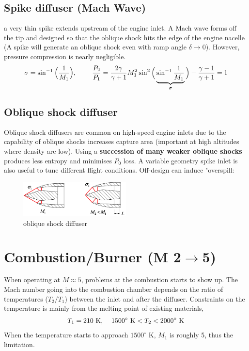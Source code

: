 \documentclass[a4paper,10pt]{article}
\begin{document}
\subsection{Spike diffuser (Mach Wave)}
a very thin spike extends upstream of the engine inlet. A Mach wave forms off the tip and designed so that the oblique shock hits the edge of the engine nacelle (A spike will generate an oblique shock even with ramp angle $\delta\rightarrow0$). However, pressure compression is nearly negligible.
\begin{gather*}
    \sigma = \sin^{-1}\Big(\frac{1}{M_1}\Big),\hspace*{0.8cm}\frac{P_2}{P_1}=\frac{2\gamma}{\gamma+1}M_1^2\sin^2\Big(\underbrace{\sin^{-1}\frac{1}{M_1}}_\sigma\Big)-\frac{\gamma-1}{\gamma+1} = 1
\end{gather*}

\subsection{Oblique shock diffuser}
Oblique shock diffusers are common on high-speed engine inlets due to the capability of oblique shocks increases capture area (important at high altitudes where density are low). Using a \textbf{succession of many weaker oblique shocks} produces less entropy and minimises $P_0$ loss. A variable geometry spike inlet is also useful to tune different flight conditions. Off-design can induce "overspill:

\begin{figure}[H]
    \centering
    \includegraphics[width=0.5\textwidth]{Figure/os_diffuser.png}
    \caption{oblique shock diffuser}
\end{figure}


\newpage
\section{Combustion/Burner (M 2$\rightarrow$5)}
When operating at $M\approx5$, problems at the combustion starts to show up. The Mach number going into the combustion chamber depends on the ratio of temperatures ($T_2/T_1$) between the inlet and after the diffuser. Constraints on the temperature is mainly from the melting point of existing materials,
\begin{gather*}
    T_1 = 210\text{ K},\hspace*{0.4cm}1500^{\circ}\text{ K}<T_2<2000^{\circ}\text{ K}
\end{gather*}
When the temperature starts to approach $1500^{\circ}$ K, $M_1$ is roughly 5, thus the limitation. 
\end{document}
